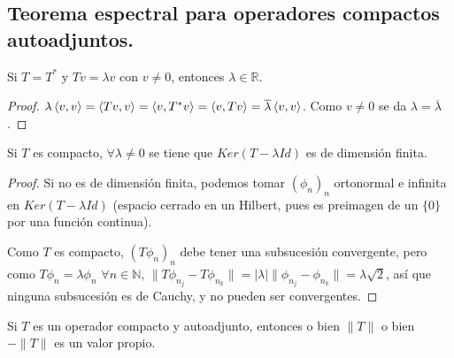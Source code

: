 \subsection{Teorema espectral para operadores compactos autoadjuntos.}

\begin{proposition}
  \label{prop:autoadj-real-eigenvalues} Si $T=T^*$ y  $Tv=\lambda v$ con $v\neq 0$, entonces $\lambda\in \mathbb{R}$. \end{proposition}

\begin{proof}
  $\lambda \left\langle v,v\right\rangle =
  \left\langle Tv,v\right\rangle=\left\langle v,T^*v\right\rangle=\left\langle v,Tv\right\rangle=\overline{\lambda}\left\langle v,v\right\rangle$. Como
  $v\neq 0$ se da $\lambda=\overline{\lambda}$.
\end{proof}

\begin{proposition}
  \label{prop:eigenspaces-finite-dim}
  Si $T$ es compacto, $\forall \lambda\neq 0$ se tiene que $Ker(T-\lambda Id)$
  es de dimensión finita.
\end{proposition}

\begin{proof}
  Si no es de dimensión finita, podemos tomar $(\phi_n)_n$ ortonormal e infinita
  en $Ker(T-\lambda Id)$ (espacio cerrado en un Hilbert, pues es preimagen de un
  $\{0\}$ por una función continua).

  Como $T$ es compacto, $(T\phi_n)_n$ debe tener una subsucesión convergente,
  pero como $T\phi_n=\lambda \phi_n$ $\forall n\in \mathbb{N}$,
  $\|T\phi_{n_j}-T\phi_{n_k}\|=|\lambda|\|\phi_{n_j}-\phi_{n_k}\|=\lambda\sqrt{2}
  $, así que ninguna subsucesión es de Cauchy, y no pueden ser convergentes.
\end{proof}

\begin{proposition}
  \label{prop:norm-eigenval}
  Si $T$ es un operador compacto y autoadjunto, entonces o bien $\|T\|$ o bien
  $-\|T\|$ es un valor propio.
\end{proposition}

